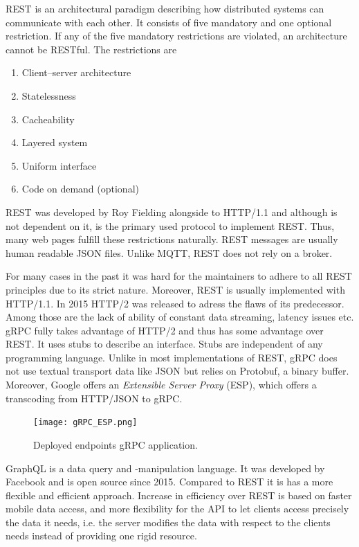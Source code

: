 REST is an architectural paradigm describing how distributed systems can communicate with each other. It consists of five mandatory and one optional restriction. If any of the five mandatory restrictions are violated, an architecture cannot be RESTful. The restrictions are 
\begin{enumerate}
    \item Client–server architecture
    \item Statelessness
    \item Cacheability
    \item Layered system
    \item Uniform interface
    \item Code on demand (optional)
\end{enumerate}
REST was developed by Roy Fielding alongside to HTTP/1.1 and although is not dependent on it, is the primary used protocol to implement REST. Thus, many web pages fulfill these restrictions naturally. REST messages are usually human readable JSON files. Unlike MQTT, REST does not rely on a broker.  \cite{Fielding2000ArchitecturalArchitectures} 

For many cases in the past it was hard for the maintainers to adhere to all REST principles due to its strict nature. Moreover, REST is usually implemented with HTTP/1.1. In 2015 HTTP/2 was released to adress the flaws of its predecessor. \cite{SayfanLastvisited2018-11-242018RESTAPIs} Among those are the lack of ability of constant data streaming, latency issues etc. gRPC fully takes advantage of HTTP/2 and thus has some advantage over REST. It uses stubs to describe an interface. Stubs are independent of any programming language. Unlike in most implementations of REST, gRPC does not use textual transport data like JSON but relies on Protobuf, a binary buffer. Moreover, Google offers an \textit{Extensible Server Proxy} (ESP), which offers a transcoding from HTTP/JSON to gRPC. \cite{2018-11-242017Grpc-gateway, Lastvisited2018-11-272018CloudGRPC} 

\begin{figure}[ht]
	\centering
  \texttt{[image: gRPC\_ESP.png]}
	\caption{Deployed endpoints gRPC application. \cite{Lastvisited2018-11-272018CloudGRPC}}
	\label{ESP}
\end{figure}

GraphQL is a data query and -manipulation language. It was developed by Facebook and is open source since 2015. Compared to REST it is has a more flexible and efficient approach. Increase in efficiency over REST is based on faster mobile data access, and more flexibility for the API to let clients access precisely the data it needs,  i.e. the server modifies the data with respect to the clients needs instead of providing one rigid resource. \cite{LastVisited2018-15-122018BasicsIntroduction} 

